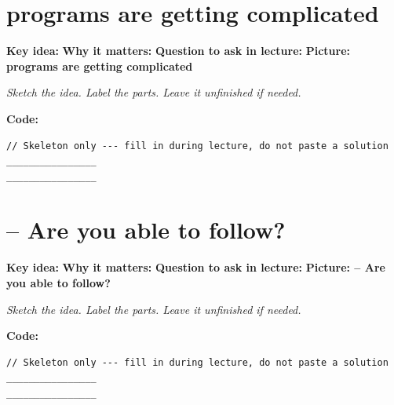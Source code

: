 \documentclass[14pt]{extarticle}
\newcommand{\deflabel}[1]{\noindent\textcolor{slotdef}{\textbf{#1}}}
\newcommand{\drawlabel}[1]{\noindent\textcolor{slotdraw}{\textbf{#1}}}
\begin{document}
\section{programs are getting complicated}
\Needspace{0.16\textheight}
\deflabel{Key idea:}
\vspace{1.1em}
\Needspace{0.16\textheight}
\deflabel{Why it matters:}
\vspace{1.1em}
\Needspace{0.16\textheight}
\deflabel{Question to ask in lecture:}
\vspace{1.1em}
\Needspace{0.28\textheight}
\drawlabel{Picture: programs are getting complicated}
{\color{slotdraw}
\begin{framed}
\color{ink}
\begin{minipage}[t][0.22\textheight]{\textwidth}
\vspace{0.4em}
\textit{Sketch the idea. Label the parts. Leave it unfinished if needed.}
\end{minipage}
\end{framed}
}
\vspace{1em}
\Needspace{0.18\textheight}
\drawlabel{Code:}
\begin{lstlisting}
// Skeleton only --- fill in during lecture, do not paste a solution
________________
________________
\end{lstlisting}
\vspace{1em}
\section{– Are you able to follow?}
\Needspace{0.16\textheight}
\deflabel{Key idea:}
\vspace{1.1em}
\Needspace{0.16\textheight}
\deflabel{Why it matters:}
\vspace{1.1em}
\Needspace{0.16\textheight}
\deflabel{Question to ask in lecture:}
\vspace{1.1em}
\Needspace{0.28\textheight}
\drawlabel{Picture: – Are you able to follow?}
{\color{slotdraw}
\begin{framed}
\color{ink}
\begin{minipage}[t][0.22\textheight]{\textwidth}
\vspace{0.4em}
\textit{Sketch the idea. Label the parts. Leave it unfinished if needed.}
\end{minipage}
\end{framed}
}
\vspace{1em}
\Needspace{0.18\textheight}
\drawlabel{Code:}
\begin{lstlisting}
// Skeleton only --- fill in during lecture, do not paste a solution
________________
________________
\end{lstlisting}
\vspace{1em}
\end{document}

